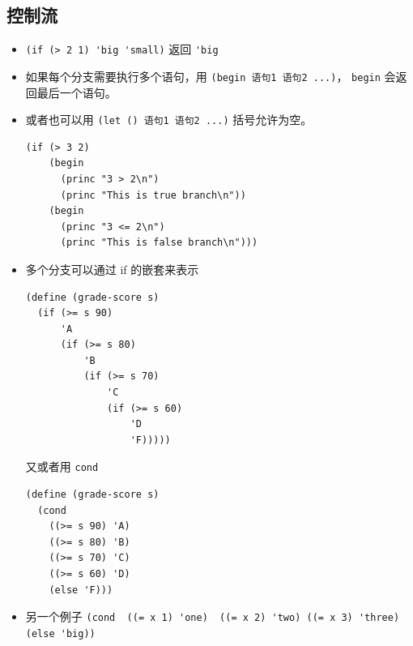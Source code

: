\subsection{控制流}
\begin{itemize}
\item \verb`(if (> 2 1) 'big 'small)` 返回 \verb`'big`
\item 如果每个分支需要执行多个语句，用 \verb`(begin 语句1 语句2 ...)`， \verb`begin` 会返回最后一个语句。
\item 或者也可以用 \verb`(let () 语句1 语句2 ...)` 括号允许为空。
\begin{lstlisting}[language=none]
(if (> 3 2)
    (begin
      (princ "3 > 2\n")
      (princ "This is true branch\n"))
    (begin
      (princ "3 <= 2\n")
      (princ "This is false branch\n")))
\end{lstlisting}
\item 多个分支可以通过 if 的嵌套来表示
\begin{lstlisting}[language=none]
(define (grade-score s)
  (if (>= s 90)
      'A
      (if (>= s 80)
          'B
          (if (>= s 70)
              'C
              (if (>= s 60)
                  'D
                  'F)))))
\end{lstlisting}
又或者用 \verb`cond`
\begin{lstlisting}[language=none]
(define (grade-score s)
  (cond
    ((>= s 90) 'A)
    ((>= s 80) 'B)
    ((>= s 70) 'C)
    ((>= s 60) 'D)
    (else 'F)))
\end{lstlisting}
\item 另一个例子 \verb`(cond  ((= x 1) 'one)  ((= x 2) 'two) ((= x 3) 'three)  (else 'big))`
\end{itemize}

